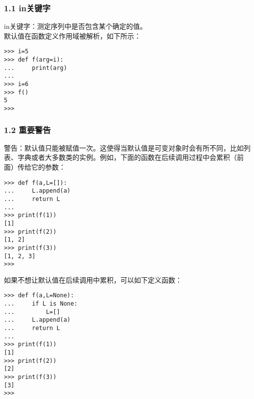 \documentclass{article}
\begin{document}
\begin{CJK}{UTF8}{gbsn}
\subsubsection*{1.1 in关键字}
in关键字：测定序列中是否包含某个确定的值。\\
默认值在函数定义作用域被解析，如下所示：
\begin{verbatim}
>>> i=5
>>> def f(arg=i):
...     print(arg)
... 
>>> i=6
>>> f()
5
>>> 
\end{verbatim}
\subsubsection*{1.2 重要警告}
警告：默认值只能被赋值一次。这使得当默认值是可变对象时会有所不同，比如列表、字典或者大多数类的实例。例如，下面的函数在后续调用过程中会累积（前面）传给它的参数：
\begin{verbatim}
>>> def f(a,L=[]):
...     L.append(a)
...     return L
... 
>>> print(f(1))
[1]
>>> print(f(2))
[1, 2]
>>> print(f(3))
[1, 2, 3]
>>> 
\end{verbatim}
如果不想让默认值在后续调用中累积，可以如下定义函数：
\begin{verbatim}
>>> def f(a,L=None):
...     if L is None:
...         L=[]
...     L.append(a)
...     return L
... 
>>> print(f(1))
[1]
>>> print(f(2))
[2]
>>> print(f(3))
[3]
>>> 
\end{verbatim}

\end{CJK}
\end{document}
